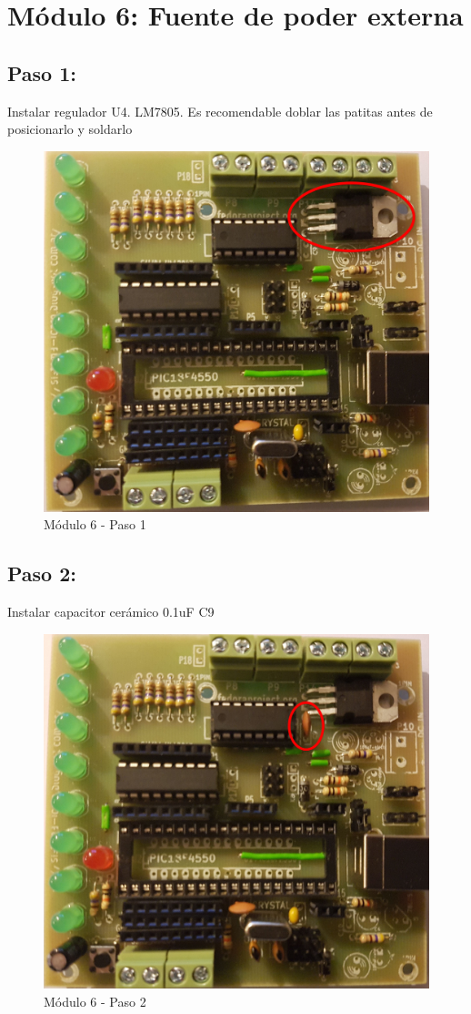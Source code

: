 \chapter{Módulo 6: Fuente de poder externa}

\section{Paso 1:}

Instalar regulador U4. LM7805. Es recomendable doblar las patitas antes de posicionarlo y soldarlo

\begin{figure}[h]
	\centering
	\includegraphics[width=0.8\linewidth]{Modulo_6/M6_1}
	\caption{Módulo 6 - Paso 1}
	\label{fig:M6_1}
\end{figure}

\newpage

\section{Paso 2:}

Instalar capacitor cerámico 0.1uF C9

\begin{figure}[h]
	\centering
	\includegraphics[width=0.8\linewidth]{Modulo_6/M6_2}
	\caption{Módulo 6 - Paso 2}
	\label{fig:M6_2}
\end{figure}

